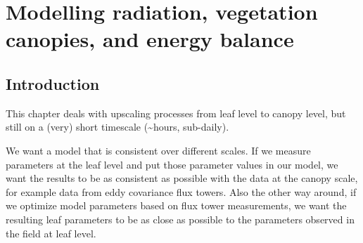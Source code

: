 \documentclass[12pt,oneside]{book}
\begin{document}
\chapter{Modelling radiation, vegetation canopies, and energy
balance}\label{modelling-radiation-vegetation-canopies-and-energy-balance}


\section{Introduction}\label{introduction}

This chapter deals with upscaling processes from leaf level to canopy
level, but still on a (very) short timescale (\textasciitilde{}hours,
sub-daily).

We want a model that is consistent over different scales. If we measure
parameters at the leaf level and put those parameter values in our
model, we want the results to be as consistent as possible with the data
at the canopy scale, for example data from eddy covariance flux towers.
Also the other way around, if we optimize model parameters based on flux
tower measurements, we want the resulting leaf parameters to be as close
as possible to the parameters observed in the field at leaf level.
\end{document}
